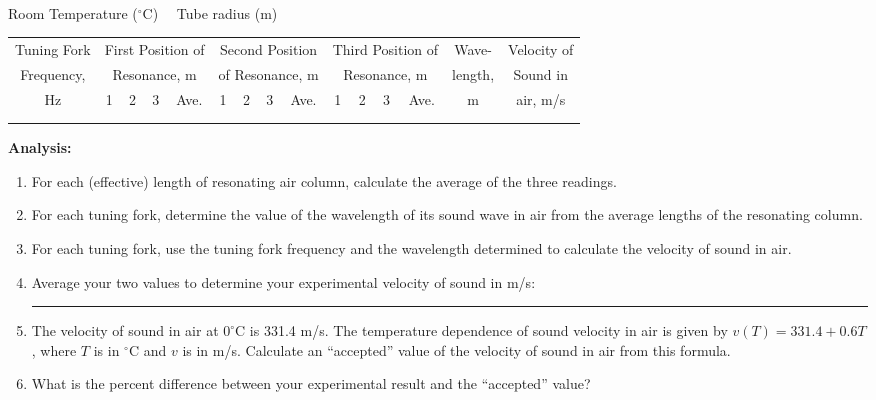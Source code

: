 \vskip35pt

 \\

\noindent Room Temperature ($^\circ$C) \hrulefill \ \  Tube radius (m) \hrulefill

\begin{center} \begin{tabular}{||c|c|c|c|c|c|c|c|c|c|c|c|c|c|c||} \hline \hline Tuning Fork & \multicolumn{4}{|c|}{First Position of} & \multicolumn{4}{|c|}{Second Position} & \multicolumn{4}{|c|}{Third Position of} & Wave- & Velocity of \\ Frequency, & \multicolumn{4}{|c|}{Resonance, m} & \multicolumn{4}{|c|}{of Resonance, m} & \multicolumn{4}{|c|}{Resonance, m} & length, & Sound in \\ \cline{2-13} Hz & 1 & 2 & 3 & Ave. & 1 & 2 & 3 & Ave. & 1 & 2 & 3 & Ave. & m & air, m/s \\ \hline \hline &&&&&&&&&&&&&& \\ \hline &&&&&&&&&&&&&& \\ \hline \hline \end{tabular} \end{center}


{\noindent \bf Analysis:} \begin{enumerate}

\item For each (effective) length of resonating air column, calculate the average of the three readings.

\item For each tuning fork, determine the value of the wavelength of its sound wave in air from the average lengths of the resonating column.

\item For each tuning fork, use the tuning fork frequency and the wavelength determined to calculate the velocity of sound in air.

\item Average your two values to determine your experimental velocity of sound in m/s: \ \ \  \rule{2cm}{1pt}

\item The velocity of sound in air at $0^\circ$C is 331.4 m/s.  The temperature dependence of sound velocity in air is given by $v(T) = 331.4 + 0.6T$, where $T$ is in $^\circ$C and $v$ is in m/s. Calculate an ``accepted'' value of the velocity of sound in air from this formula.

\vskip35pt

\item What is the percent difference between your experimental result and the ``accepted'' value?

\end{enumerate}

